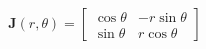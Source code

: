 \documentclass[preview]{standalone}
\begin{document}
\begin{align*}
\mathbf{J}(r,\theta) = \begin{bmatrix} \cos\theta & -r\sin\theta \\ \sin\theta & r\cos\theta \end{bmatrix}
\end{align*}
\end{document}
